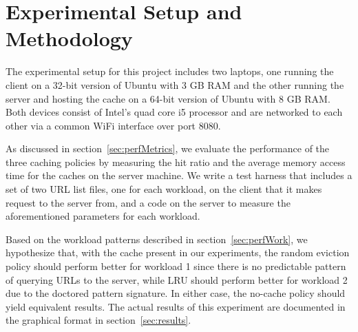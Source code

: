 \documentclass[11pt,pdftex,twocolumn]{article}
\begin{document}
\section{Experimental Setup and Methodology}
\label{sec:exp}
The experimental setup for this project includes two laptops, one running the client on a 32-bit version of Ubuntu with 3 GB RAM and the other running the server and hosting the cache on a 64-bit version of Ubuntu with 8 GB RAM. Both devices consist of Intel's quad core i5 processor and are networked to each other via a common WiFi interface over port 8080.

As discussed in section~\ref{sec:perfMetrics}, we evaluate the performance of the three caching policies by measuring the hit ratio and the average memory access time for the caches on the server machine. We write a test harness that includes a set of two URL list files, one for each workload, on the client that it makes request to the server from, and a code on the server to measure the aforementioned parameters for each workload.

Based on the workload patterns described in section~\ref{sec:perfWork}, we hypothesize that, with the cache present in our experiments, the random eviction policy should perform better for workload 1 since there is no predictable pattern of querying URLs to the server, while LRU should perform better for workload 2 due to the doctored pattern signature. In either case, the no-cache policy should yield equivalent results. The actual results of this experiment are documented in the graphical format in section~\ref{sec:results}.
\end{document}
